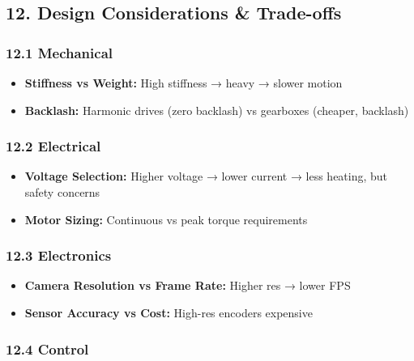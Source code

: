 \documentclass[
]{article}
\providecommand{\tightlist}{%
  \setlength{\itemsep}{0pt}\setlength{\parskip}{0pt}}
\begin{document}
\hypertarget{design-considerations-trade-offs}{%
\subsection{12. Design Considerations \&
Trade-offs}\label{design-considerations-trade-offs}}

\hypertarget{mechanical}{%
\subsubsection{12.1 Mechanical}\label{mechanical}}

\begin{itemize}
\tightlist
\item
  \textbf{Stiffness vs Weight:} High stiffness → heavy → slower motion
\item
  \textbf{Backlash:} Harmonic drives (zero backlash) vs gearboxes
  (cheaper, backlash)
\end{itemize}

\hypertarget{electrical}{%
\subsubsection{12.2 Electrical}\label{electrical}}

\begin{itemize}
\tightlist
\item
  \textbf{Voltage Selection:} Higher voltage → lower current → less
  heating, but safety concerns
\item
  \textbf{Motor Sizing:} Continuous vs peak torque requirements
\end{itemize}

\hypertarget{electronics}{%
\subsubsection{12.3 Electronics}\label{electronics}}

\begin{itemize}
\tightlist
\item
  \textbf{Camera Resolution vs Frame Rate:} Higher res → lower FPS
\item
  \textbf{Sensor Accuracy vs Cost:} High-res encoders expensive
\end{itemize}

\hypertarget{control}{%
\subsubsection{12.4 Control}\label{control}}
\end{document}
